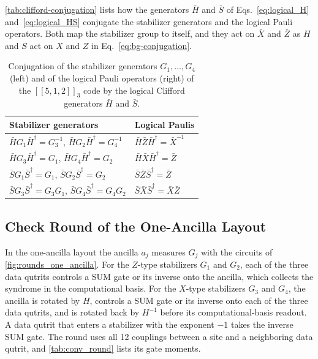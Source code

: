 \autoref{tab:clifford-conjugation} lists how the generators $\bar H$ and $\bar S$ of Eqs.~\eqref{eq:logical_H} and~\eqref{eq:logical_HS} conjugate the stabilizer generators and the logical Pauli operators. Both map the stabilizer group to itself, and they act on $\bar X$ and $\bar Z$ as $H$ and $S$ act on $X$ and $Z$ in Eq.~\eqref{eq:bg-conjugation}.

\begin{table}[tb]
  \centering
  \begin{tabular}{l|l}
    \hline
    Stabilizer generators & Logical Paulis \\
    \hline
    $\bar H G_1 \bar H^\dagger = G_3^{-1}$, \quad $\bar H G_2 \bar H^\dagger = G_4^{-1}$
      & $\bar H \bar Z \bar H^\dagger = \bar X^{-1}$ \\
    $\bar H G_3 \bar H^\dagger = G_1$, \quad $\bar H G_4 \bar H^\dagger = G_2$
      & $\bar H \bar X \bar H^\dagger = \bar Z$ \\
    $\bar S G_1 \bar S^\dagger = G_1$, \quad $\bar S G_2 \bar S^\dagger = G_2$
      & $\bar S \bar Z \bar S^\dagger = \bar Z$ \\
    $\bar S G_3 \bar S^\dagger = G_3 G_1$, \quad $\bar S G_4 \bar S^\dagger = G_4 G_2$
      & $\bar S \bar X \bar S^\dagger = \bar X \bar Z$ \\
    \hline
  \end{tabular}
  \caption{Conjugation of the stabilizer generators $G_1, \dots, G_4$ (left) and of the logical Pauli operators (right) of the $[[5,1,2]]_3$ code by the logical Clifford generators $\bar H$ and $\bar S$.}
  \label{tab:clifford-conjugation}
\end{table}

\subsection{Check Round of the One-Ancilla Layout}
\label{app:rounds-one-ancilla}

In the one-ancilla layout the ancilla $a_j$ measures $G_j$ with the circuits of \autoref{fig:rounds_one_ancilla}. For the $Z$-type stabilizers $G_1$ and $G_2$, each of the three data qutrits controls a SUM gate or its inverse onto the ancilla, which collects the syndrome in the computational basis. For the $X$-type stabilizers $G_3$ and $G_4$, the ancilla is rotated by $H$, controls a SUM gate or its inverse onto each of the three data qutrits, and is rotated back by $H^{-1}$ before its computational-basis readout. A data qutrit that enters a stabilizer with the exponent $-1$ takes the inverse SUM gate. The round uses all 12 couplings between a site and a neighboring data qutrit, and \autoref{tab:conv_round} lists its gate moments.


